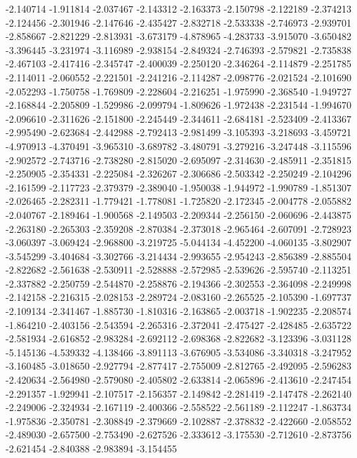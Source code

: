 -2.140714
-1.911814
-2.037467
-2.143312
-2.163373
-2.150798
-2.122189
-2.374213
-2.124456
-2.301946
-2.147646
-2.435427
-2.832718
-2.533338
-2.746973
-2.939701
-2.858667
-2.821229
-2.813931
-3.673179
-4.878965
-4.283733
-3.915070
-3.650482
-3.396445
-3.231974
-3.116989
-2.938154
-2.849324
-2.746393
-2.579821
-2.735838
-2.467103
-2.417416
-2.345747
-2.400039
-2.250120
-2.346264
-2.114879
-2.251785
-2.114011
-2.060552
-2.221501
-2.241216
-2.114287
-2.098776
-2.021524
-2.101690
-2.052293
-1.750758
-1.769809
-2.228604
-2.216251
-1.975990
-2.368540
-1.949727
-2.168844
-2.205809
-1.529986
-2.099794
-1.809626
-1.972438
-2.231544
-1.994670
-2.096610
-2.311626
-2.151800
-2.245449
-2.344611
-2.684181
-2.523409
-2.413367
-2.995490
-2.623684
-2.442988
-2.792413
-2.981499
-3.105393
-3.218693
-3.459721
-4.970913
-4.370491
-3.965310
-3.689782
-3.480791
-3.279216
-3.247448
-3.115596
-2.902572
-2.743716
-2.738280
-2.815020
-2.695097
-2.314630
-2.485911
-2.351815
-2.250905
-2.354331
-2.225084
-2.326267
-2.306686
-2.503342
-2.250249
-2.104296
-2.161599
-2.117723
-2.379379
-2.389040
-1.950038
-1.944972
-1.990789
-1.851307
-2.026465
-2.282311
-1.779421
-1.778081
-1.725820
-2.172345
-2.004778
-2.055882
-2.040767
-2.189464
-1.900568
-2.149503
-2.209344
-2.256150
-2.060696
-2.443875
-2.263180
-2.265303
-2.359208
-2.870384
-2.373018
-2.965464
-2.607091
-2.728923
-3.060397
-3.069424
-2.968800
-3.219725
-5.044134
-4.452200
-4.060135
-3.802907
-3.545299
-3.404684
-3.302766
-3.214434
-2.993655
-2.954243
-2.856389
-2.885504
-2.822682
-2.561638
-2.530911
-2.528888
-2.572985
-2.539626
-2.595740
-2.113251
-2.337882
-2.250759
-2.544870
-2.258876
-2.194366
-2.302553
-2.364098
-2.249998
-2.142158
-2.216315
-2.028153
-2.289724
-2.083160
-2.265525
-2.105390
-1.697737
-2.109134
-2.341467
-1.885730
-1.810316
-2.163865
-2.003718
-1.902235
-2.208574
-1.864210
-2.403156
-2.543594
-2.265316
-2.372041
-2.475427
-2.428485
-2.635722
-2.581934
-2.616852
-2.983284
-2.692112
-2.698368
-2.822682
-3.123396
-3.031128
-5.145136
-4.539332
-4.138466
-3.891113
-3.676905
-3.534086
-3.340318
-3.247952
-3.160485
-3.018650
-2.927794
-2.877417
-2.755009
-2.812765
-2.492095
-2.596283
-2.420634
-2.564980
-2.579080
-2.405802
-2.633814
-2.065896
-2.413610
-2.247454
-2.291357
-1.929941
-2.107517
-2.156357
-2.149842
-2.281419
-2.147478
-2.262140
-2.249006
-2.324934
-2.167119
-2.400366
-2.558522
-2.561189
-2.112247
-1.863734
-1.975836
-2.350781
-2.308849
-2.379669
-2.102887
-2.378832
-2.422660
-2.058552
-2.489030
-2.657500
-2.753490
-2.627526
-2.333612
-3.175530
-2.712610
-2.873756
-2.621454
-2.840388
-2.983894
-3.154455
